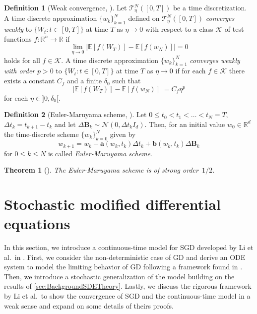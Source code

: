 \documentclass[12pt]{article}
\newtheorem{theorem}{Theorem}[section]
\theoremstyle{definition}
\newtheorem{definition}[definition]{Definition}
\numberwithin{equation}{section}
\newcommand{\R}{\mathbb{R}}
\newcommand{\CN}{\mathcal{N}}
\newcommand{\ev}[1]{\mathbb{E}\left[{#1}\right]}
\begin{document}
\begin{definition}[Weak convergence, ]
  \label{def:weak_convergence}
  Let $\mathcal{T}_\eta^N([0,T])$ be a time discretization. A time discrete approximation $\{w_k\}_{k=1}^N$ defined on $\mathcal{T}_\eta^N([0,T])$ \emph{converges weakly} to $\{W_t:t\in [0,T] \}$ at time $T$ as $\eta \rightarrow 0$ with respect to a class $\mathcal{K}$ of test functions $f: \R^n \rightarrow \R$ if 
  \begin{equation}
    \lim_{\eta \rightarrow 0} |\ev{f(W_T)} - \ev{f(w_N)}| = 0
  \end{equation}
  holds for all $f \in \mathcal{K}$.
  A time discrete approximation $\{w_k\}_{k=1}^N$ \emph{converges weakly with order} $p > 0$ to $\{W_t:t\in [0,T] \}$ at time $T$ as $\eta \rightarrow 0$ if for each $f \in \mathcal{K}$ there exists a constant $C_f$ and a finite $\delta_0$ such that 
  \begin{equation}
     |\ev{f(W_T)} - \ev{f(w_N)}| = C_f \eta^p
  \end{equation}
  for each $\eta \in ]0, \delta_0[$.
\end{definition}
\begin{definition}[Euler-Maruyama scheme, ]
  \label{def:euler_maruyama}
  Let $0 \leq t_0 < t_1 < \dots < t_N = T$, $\Delta t_k = t_{k+1} - t_k$ and let $\Delta \mathbf{B}_k \sim \CN(0,\Delta t_k I_d)$. Then, for an initial value $w_0 \in \R^d$ the time-discrete scheme $\{w_k\}_{k=0}^N$ given by
\begin{equation}
  \label{eq:euler_maruyama}
  w_{k+1} = w_k + \mathbf{a}(w_k, t_k)\Delta t_k + \mathbf{b}(w_k, t_k) \Delta \mathbf{B}_k
\end{equation}
for $0 \leq k \leq N$ is called \emph{Euler-Maruyama scheme}.
\end{definition}

\begin{theorem}[]
  The Euler-Maruyama scheme is of strong order~$1/2$.
\end{theorem}
\section{Stochastic modified differential equations}
\label{sec:sde_model}
In this section, we introduce a continuous-time model for SGD developed by Li et al.\ in \cite{liStochasticModifiedEquations2017}. First, we consider the non-deterministic case of GD and derive an ODE system to model the limiting behavior of GD following a framework found in \cite{hairerGeometricNumericalIntegration2013}. Then, we introduce a stochastic generalization of the model building on the results of \autoref{sec:BackgroundSDETheory}. Lastly, we discuss the rigorous framework by Li et al.\ to show the convergence of SGD and the continuous-time model in a weak sense and expand on some details of theirs proofs.
\end{document}
